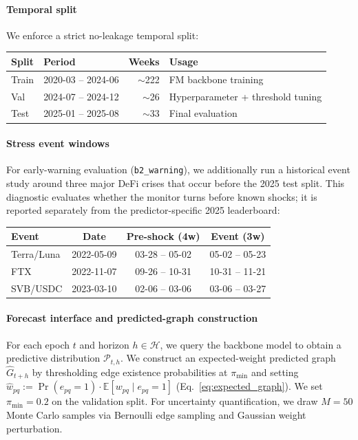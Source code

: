 \paragraph{Temporal split}
We enforce a strict no-leakage temporal split:
\begin{center}
\footnotesize
\setlength{\tabcolsep}{3pt}
\begin{tabularx}{\linewidth}{@{}llrX@{}}
\toprule
Split & Period & Weeks & Usage \\
\midrule
Train & 2020-03 -- 2024-06 & $\sim$222 & FM backbone training \\
Val   & 2024-07 -- 2024-12 & $\sim$26  & Hyperparameter + threshold tuning \\
Test  & 2025-01 -- 2025-08 & $\sim$33  & Final evaluation \\
\bottomrule
\end{tabularx}
\end{center}

\paragraph{Stress event windows}
For early-warning evaluation (\texttt{b2\_warning}), we additionally run a historical event study around three major DeFi crises that occur before the 2025 test split. This diagnostic evaluates whether the monitor turns before known shocks; it is reported separately from the predictor-specific 2025 leaderboard:
\begin{center}
\footnotesize
\setlength{\tabcolsep}{3pt}
\begin{tabularx}{\linewidth}{@{}lccc@{}}
\toprule
Event & Date & Pre-shock (4w) & Event (3w) \\
\midrule
Terra/Luna & 2022-05-09 & 03-28 -- 05-02 & 05-02 -- 05-23 \\
FTX        & 2022-11-07 & 09-26 -- 10-31 & 10-31 -- 11-21 \\
SVB/USDC   & 2023-03-10 & 02-06 -- 03-06 & 03-06 -- 03-27 \\
\bottomrule
\end{tabularx}
\end{center}

\paragraph{Forecast interface and predicted-graph construction}
For each epoch $t$ and horizon $h\in\mathcal{H}$, we query the backbone model to obtain a predictive distribution $\mathcal{P}_{t,h}$. We construct an expected-weight predicted graph $\widehat{G}_{t+h}$ by thresholding edge existence probabilities at $\pi_{\min}$ and setting $\widehat{w}_{pq} := \Pr(e_{pq}=1)\cdot \mathbb{E}[w_{pq}\mid e_{pq}=1]$ (Eq.~\eqref{eq:expected_graph}). We set $\pi_{\min}=0.2$ on the validation split. For uncertainty quantification, we draw $M=50$ Monte Carlo samples via Bernoulli edge sampling and Gaussian weight perturbation.


